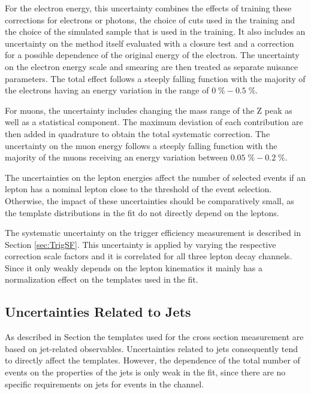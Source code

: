For the electron energy, this uncertainty combines the effects of training these corrections for electrons or photons, the choice of cuts used in the training and the choice of the simulated sample that is used in the training. It also includes an uncertainty on the method itself evaluated with a closure test and a correction for a possible
dependence of the original energy of the electron.
The uncertainty on the electron energy scale and smearing are then treated as separate nuisance parameters.
The total effect follows a steeply falling function with the majority of the electrons having an energy variation in the range of $0 \; \% - 0.5 \; \%$.

For muons, the uncertainty includes changing the mass range of the Z peak as well as a statistical component. The maximum deviation of each contribution are then added in quadrature to obtain the total systematic correction.
The uncertainty on the muon energy follows a steeply falling function with the majority of the muons receiving an energy variation between $0.05 \; \% - 0.2 \; \%$.

The uncertainties on the lepton energies affect the number of selected events if an lepton has a nominal lepton \pt close to the threshold of the event selection.
Otherwise, the impact of these uncertainties should be comparatively small, as the template distributions in the fit do not directly depend on the leptons.

The systematic uncertainty on the trigger efficiency measurement is described in Section \ref{sec:TrigSF}. This uncertainty is applied by varying the respective correction scale factors
and it is correlated for all three lepton decay channels. Since it only weakly depends on the lepton kinematics it mainly has a normalization effect on the templates used in the fit.

\subsection{Uncertainties Related to Jets}

As described in Section  the templates used for the cross section measurement are based on jet-related observables.
Uncertainties related to jets consequently tend to directly affect the templates. However, the dependence of the total number of events on the properties of the jets is only weak in the fit,
since there are no specific requirements on jets for events in the \emu channel.

